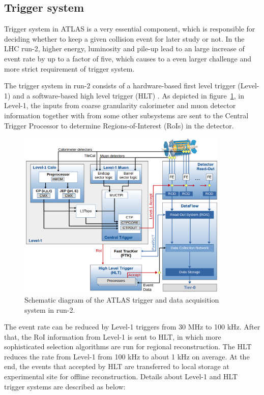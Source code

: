 \subsection{Trigger system}

Trigger system in ATLAS is a very essential component, which is responsible for deciding whether to keep a given collision event for later study or not.
In the LHC run-2, higher energy, luminosity and pile-up lead to an large increase of event rate by up to a factor of five, which causes to a even larger challenge and more strict requirement of trigger system.

The trigger system in run-2 consists of a hardware-based first level trigger (Level-1) and a software-based high level trigger (HLT) \cite{Ruiz-Martinez:2133909}.
As depicted in figure~\ref{fig:trig_syst}, in Level-1, the inputs from coarse granularity calorimeter and muon detector information together with from some other subsystems are sent to the Central Trigger Processor to determine Regions-of-Interest (RoIs) in the detector. 
\begin{figure}[!htb]
  \centering
  \includegraphics[width=0.9\textwidth]{figures/Detector/tdaq-run2-schematic2017.png}
  \caption{Schematic diagram of the ATLAS trigger and data acquisition system in run-2.}
  \label{fig:trig_syst}
\end{figure}
The event rate can be reduced by Level-1 triggers from 30 MHz to 100 kHz. 
After that, the RoI information from Level-1 is sent to HLT, in which more sophisticated selection algorithms are run for regional reconstruction.
The HLT reduces the rate from Level-1 from 100 kHz to about 1 kHz on average.
At the end, the events that accepted by HLT are transferred to local storage at experimental site for offline reconstruction.
Details about Level-1 and HLT trigger systems are described as below:


